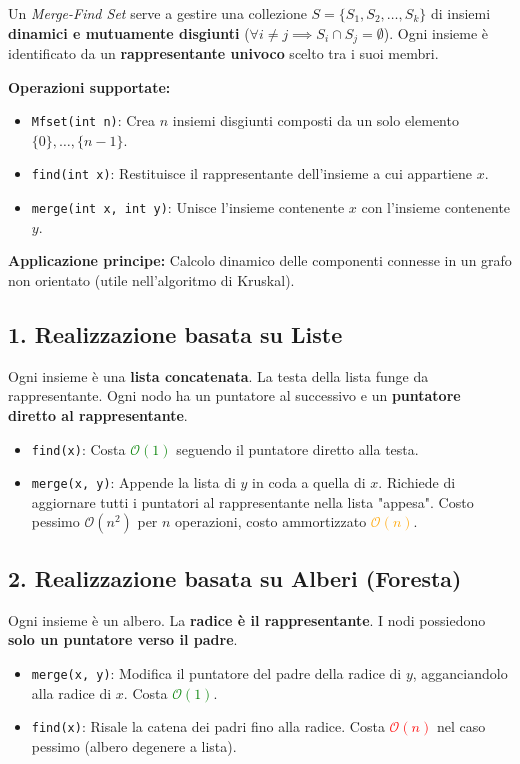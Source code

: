 \documentclass[12pt, a4paper]{article}
\begin{document}
\begin{tcolorbox}[colback=lightergray!10, colframe=tocsec, title=\textbf{Definizione}]
Un \textit{Merge-Find Set} serve a gestire una collezione $S = \{S_1, S_2, \dots, S_k\}$ di insiemi \textbf{dinamici e mutuamente disgiunti} ($\forall i \neq j \implies S_i \cap S_j = \emptyset$).
Ogni insieme è identificato da un \textbf{rappresentante univoco} scelto tra i suoi membri.
\end{tcolorbox}

\textbf{Operazioni supportate:}
\begin{itemize}
\item \texttt{Mfset(int n)}: Crea $n$ insiemi disgiunti composti da un solo elemento $\{0\}, \dots, \{n-1\}$.
\item \texttt{find(int x)}: Restituisce il rappresentante dell'insieme a cui appartiene $x$.
\item \texttt{merge(int x, int y)}: Unisce l'insieme contenente $x$ con l'insieme contenente $y$.
\end{itemize}
\textbf{Applicazione principe:} Calcolo dinamico delle componenti connesse in un grafo non orientato (utile nell'algoritmo di Kruskal).

\subsection{1. Realizzazione basata su Liste}
Ogni insieme è una \textbf{lista concatenata}. La testa della lista funge da rappresentante. Ogni nodo ha un puntatore al successivo e un \textbf{puntatore diretto al rappresentante}.
\begin{itemize}
\item \texttt{find(x)}: Costa \textcolor{green}{$\mathcal{O}(1)$} seguendo il puntatore diretto alla testa.
\item \texttt{merge(x, y)}: Appende la lista di $y$ in coda a quella di $x$. Richiede di aggiornare tutti i puntatori al rappresentante nella lista "appesa". Costo pessimo $\mathcal{O}(n^2)$ per $n$ operazioni, costo ammortizzato \textcolor{orange}{$\mathcal{O}(n)$}.
\end{itemize}

\subsection{2. Realizzazione basata su Alberi (Foresta)}
Ogni insieme è un albero. La \textbf{radice è il rappresentante}. I nodi possiedono \textbf{solo un puntatore verso il padre}.
\begin{itemize}
\item \texttt{merge(x, y)}: Modifica il puntatore del padre della radice di $y$, agganciandolo alla radice di $x$. Costa \textcolor{green}{$\mathcal{O}(1)$}.
\item \texttt{find(x)}: Risale la catena dei padri fino alla radice. Costa \textcolor{red}{$\mathcal{O}(n)$} nel caso pessimo (albero degenere a lista).
\end{itemize}
\end{document}
